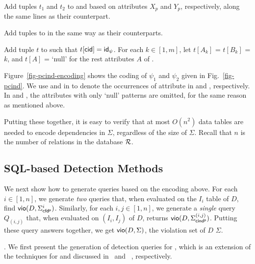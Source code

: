 \vspace{-0.5ex}\bi
\item Add tuples $t_1$ and $t_2$ to  and 
based on attributes $X_p$ and $Y_p$, respectively, along the
same lines as their \pCFD counterpart.
\item Add tuples to \Enc{\ne} in the same way as their
\pCFD counterparts.
\item Add tuple $t$ to \Enc{} such that $t[\protect\mathsf{cid}] = {\mathsf{id}}_\psi$.
For each $k\in[1, m]$,  let $t[A_k]$ = $t[B_k]$ = $k$, and $t[A]$ =
`null' for the rest attributes $A$ of \Enc{}. \ei \vspace{-1ex}




\begin{example} \label{exa-enc-pfind}
Figure~\ref{fig-pcind-encoding} shows the coding of \pCINDs $\psi_1$
and $\psi_2$ given in Fig.~\ref{fig-pcind}. We use  and
 in \Enc{} to denote the occurrences of attribute
 in  and , respectively. In
 and , the attributes with only `null' patterns are
omitted, for the same reason as \pCFDs mentioned above.
\end{example}

Putting these together, it is easy to verify that at most $O(n^2)$
data tables are needed to encode dependencies in $\Sigma$,
regardless of the size of $\Sigma$. Recall that $n$ is the number of
relations in the database $\R$.


\subsection{SQL-based Detection Methods}

We next show how to generate \SQL queries based on the encoding
above. For each $i\in [1, n]$, we generate {\em two} \SQL queries
that, when evaluated on the $I_i$ table of $D$, find ${\mathsf{vio}}(D,
\Sigma_{{\mathsf{cfd^p}}}^i)$. Similarly, for each $i,j \in [1, n]$, we generate a {\em
single} \SQL query $Q_{(i,j)}$ that, when evaluated on $(I_i, I_j)$
of $D$, returns ${\mathsf{vio}}(D, \Sigma_{{\mathsf{cind^p}}}^{(i,j)})$. Putting these query
answers together, we get ${\mathsf{vio}}(D, \Sigma)$, the violation set of
$D$ \wrt $\Sigma$.



. We first present the generation of
detection queries for \pCFDs, which is an extension of the
\SQL techniques for \CFDs and \eCFDs discussed in~\cite{CFDs} and ~\cite{icde08}, respectively.

